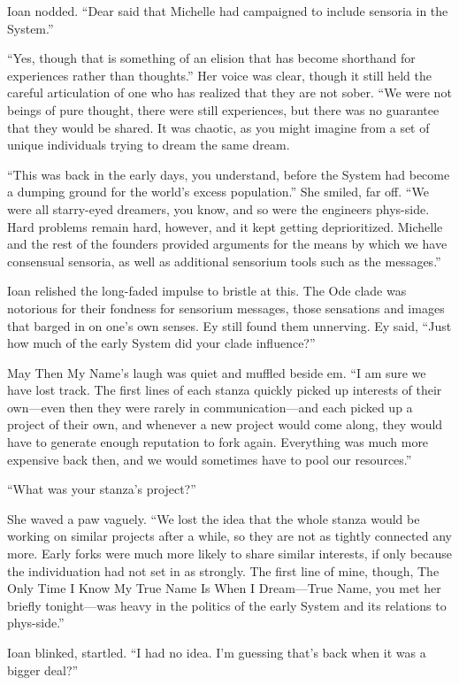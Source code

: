Ioan nodded. ``Dear said that Michelle had campaigned to include sensoria in the System.''

``Yes, though that is something of an elision that has become shorthand for experiences rather than thoughts.'' Her voice was clear, though it still held the careful articulation of one who has realized that they are not sober. ``We were not beings of pure thought, there were still experiences, but there was no guarantee that they would be shared. It was chaotic, as you might imagine from a set of unique individuals trying to dream the same dream.

``This was back in the early days, you understand, before the System had become a dumping ground for the world's excess population.'' She smiled, far off. ``We were all starry-eyed dreamers, you know, and so were the engineers phys-side. Hard problems remain hard, however, and it kept getting deprioritized. Michelle and the rest of the founders provided arguments for the means by which we have consensual sensoria, as well as additional sensorium tools such as the messages.''

Ioan relished the long-faded impulse to bristle at this. The Ode clade was notorious for their fondness for sensorium messages, those sensations and images that barged in on one's own senses. Ey still found them unnerving. Ey said, ``Just how much of the early System did your clade influence?''

May Then My Name's laugh was quiet and muffled beside em. ``I am sure we have lost track. The first lines of each stanza quickly picked up interests of their own---even then they were rarely in communication---and each picked up a project of their own, and whenever a new project would come along, they would have to generate enough reputation to fork again. Everything was much more expensive back then, and we would sometimes have to pool our resources.''

``What was your stanza's project?''

She waved a paw vaguely. ``We lost the idea that the whole stanza would be working on similar projects after a while, so they are not as tightly connected any more. Early forks were much more likely to share similar interests, if only because the individuation had not set in as strongly. The first line of mine, though, The Only Time I Know My True Name Is When I Dream---True Name, you met her briefly tonight---was heavy in the politics of the early System and its relations to phys-side.''

Ioan blinked, startled. ``I had no idea. I'm guessing that's back when it was a bigger deal?''

